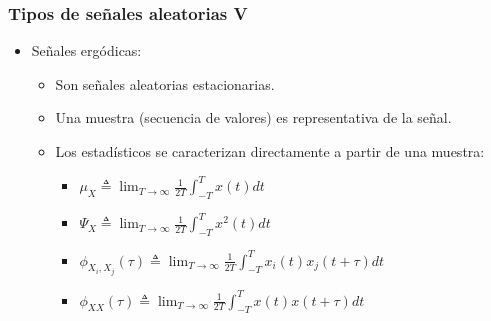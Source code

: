 \documentclass{beamer}
\numberwithin{section}{part}
\begin{document}
\begin{frame}
  \frametitle{Tipos de señales aleatorias V}
    \vspace{-0.2cm}
    \footnotesize
    \begin{itemize}
      \item \alert{Señales ergódicas: }
      \begin{itemize}
        \footnotesize
        \item Son señales aleatorias \alert{estacionarias}.
        \item Una muestra (secuencia de valores) es representativa de la señal.
        \vspace{0.1cm}
        \item Los estadísticos se caracterizan directamente a partir de una muestra:
        \begin{itemize}\scriptsize
          \item $\mu_X \triangleq \lim_{T \rightarrow \infty} \frac{1}{2T}\int_{-T}^T x(t)dt$
          \item $\Psi_X \triangleq \lim_{T \rightarrow \infty} \frac{1}{2T} \int_{-T}^T x^2(t)dt$
          \item $\phi_{X_i,X_j}(\tau)  \triangleq \lim_{T \rightarrow \infty} \frac{1}{2T}\int_{-T}^T x_i(t)x_j(t+\tau)dt$
          \item $\phi_{XX}(\tau) \triangleq \lim_{T \rightarrow \infty} \frac{1}{2T}\int_{-T}^T x(t)x(t+\tau)dt$
        \end{itemize}
    \end{itemize}
  \end{itemize}
\end{frame}
\end{document}
